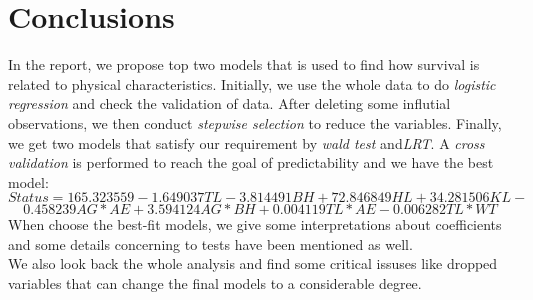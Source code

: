 \documentclass[12pt,a4paper]{article}
\begin{document}
\section{Conclusions}
In the report, we propose top two models that is used to find how survival is related to physical characteristics. Initially, we use the whole data to do \emph{logistic regression} and check the validation of data. After deleting some influtial observations, we then conduct \emph{stepwise selection} to reduce the variables. Finally, we get two models that satisfy our requirement by \emph{wald test} and\emph{LRT}. A \emph{cross validation} is performed to reach the goal of predictability and we have the best model:
\[Status = 165.323559 - 1.649037TL - 3.814491BH + 72.846849HL + 34.281506KL -\]
 \[0.458239AG*AE + 3.594124AG*BH + 0.004119TL*AE - 0.006282TL*WT\]
When choose the best-fit models, we give some interpretations about coefficients and some details concerning to tests have been mentioned as well.\\
\newline
We also look back the whole analysis and find some critical issuses like dropped variables that can change the final models to a considerable degree.
\appendix
\end{document}
